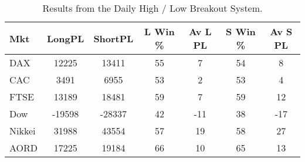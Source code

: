 \begin{table}[ht]
\centering
\caption[Results from the Daily High / Low Breakout System]{Results from the Daily High / Low Breakout System.} 
\label{tab:hl_bout_sys}
\begin{tabular}{lcccccc}
  \toprule Mkt & LongPL & ShortPL & L Win \% & Av L PL & S Win \% & Av S PL \\ 
  \midrule DAX & 12225 & 13411 & 55 & 7 & 54 & 8 \\ 
  CAC & 3491 & 6955 & 53 & 2 & 53 & 4 \\ 
  FTSE & 13189 & 18481 & 59 & 7 & 59 & 12 \\ 
  Dow & -19598 & -28337 & 42 & -11 & 38 & -17 \\ 
  Nikkei & 31988 & 43554 & 57 & 19 & 58 & 27 \\ 
  AORD & 17225 & 19184 & 66 & 10 & 65 & 13 \\ 
   \bottomrule \end{tabular}
\end{table}
